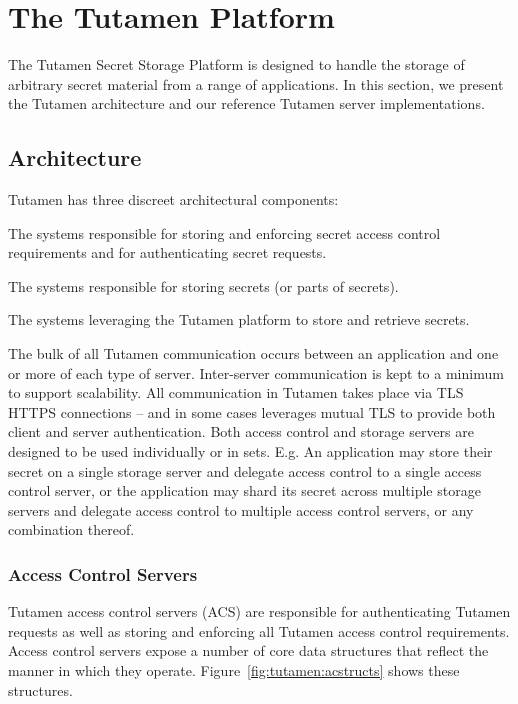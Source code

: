 \section{The Tutamen Platform}
\label{sec:tutamen}

The Tutamen Secret Storage Platform is designed to handle the storage
of arbitrary secret material from a range of applications. In this
section, we present the Tutamen architecture and our reference Tutamen
server implementations.

\subsection{Architecture}
\label{sec:tutamen:arch}

Tutamen has three discreet architectural components:

\begin{packed_desc}
\item[Access Control Servers (ACS):] The systems responsible for
  storing and enforcing secret access control requirements and for
  authenticating secret requests.
\item[Storage Servers (SS):] The systems responsible for storing
  secrets (or parts of secrets).
\item[Applications:] The systems leveraging the Tutamen platform to
  store and retrieve secrets.
\end{packed_desc}

The bulk of all Tutamen communication occurs between an application
and one or more of each type of server. Inter-server communication is
kept to a minimum to support scalability. All communication in Tutamen
takes place via TLS~\cite{dierks2008} HTTPS connections -- and in some
cases leverages mutual TLS to provide both client and server
authentication. Both access control and storage servers are designed
to be used individually or in sets. E.g. An application may store
their secret on a single storage server and delegate access control to
a single access control server, or the application may shard its
secret across multiple storage servers and delegate access control to
multiple access control servers, or any combination thereof.

\subsubsection{Access Control Servers}
\label{sec:tutamen:arch:acs}

Tutamen access control servers (ACS) are responsible for
authenticating Tutamen requests as well as storing and enforcing all
Tutamen access control requirements. Access control servers expose a
number of core data structures that reflect the manner in which they
operate. Figure~\ref{fig:tutamen:acstructs} shows these structures.

